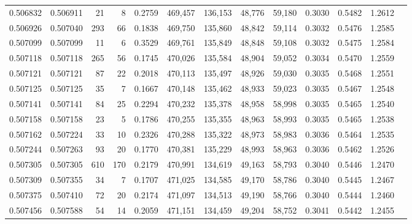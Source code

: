 \begin{tabular}{rrrrrrrrrrrrr}
0.506832 & 0.506911 &    21 &     8 &                                     0.2759 & 469,457 & 136,153 &  48,776 &  59,180 & 0.3030 & 0.5482 & 1.2612 \\
0.506926 & 0.507040 &   293 &    66 &                                     0.1838 & 469,750 & 135,860 &  48,842 &  59,114 & 0.3032 & 0.5476 & 1.2585 \\
0.507099 & 0.507099 &    11 &     6 &                                     0.3529 & 469,761 & 135,849 &  48,848 &  59,108 & 0.3032 & 0.5475 & 1.2584 \\
0.507118 & 0.507118 &   265 &    56 &                                     0.1745 & 470,026 & 135,584 &  48,904 &  59,052 & 0.3034 & 0.5470 & 1.2559 \\
0.507121 & 0.507121 &    87 &    22 &                                     0.2018 & 470,113 & 135,497 &  48,926 &  59,030 & 0.3035 & 0.5468 & 1.2551 \\
0.507125 & 0.507125 &    35 &     7 &                                     0.1667 & 470,148 & 135,462 &  48,933 &  59,023 & 0.3035 & 0.5467 & 1.2548 \\
0.507141 & 0.507141 &    84 &    25 &                                     0.2294 & 470,232 & 135,378 &  48,958 &  58,998 & 0.3035 & 0.5465 & 1.2540 \\
0.507158 & 0.507158 &    23 &     5 &                                     0.1786 & 470,255 & 135,355 &  48,963 &  58,993 & 0.3035 & 0.5465 & 1.2538 \\
0.507162 & 0.507224 &    33 &    10 &                                     0.2326 & 470,288 & 135,322 &  48,973 &  58,983 & 0.3036 & 0.5464 & 1.2535 \\
0.507244 & 0.507263 &    93 &    20 &                                     0.1770 & 470,381 & 135,229 &  48,993 &  58,963 & 0.3036 & 0.5462 & 1.2526 \\
0.507305 & 0.507305 &   610 &   170 &                                     0.2179 & 470,991 & 134,619 &  49,163 &  58,793 & 0.3040 & 0.5446 & 1.2470 \\
0.507309 & 0.507355 &    34 &     7 &                                     0.1707 & 471,025 & 134,585 &  49,170 &  58,786 & 0.3040 & 0.5445 & 1.2467 \\
0.507375 & 0.507410 &    72 &    20 &                                     0.2174 & 471,097 & 134,513 &  49,190 &  58,766 & 0.3040 & 0.5444 & 1.2460 \\
0.507456 & 0.507588 &    54 &    14 &                                     0.2059 & 471,151 & 134,459 &  49,204 &  58,752 & 0.3041 & 0.5442 & 1.2455 \\

\end{tabular}
